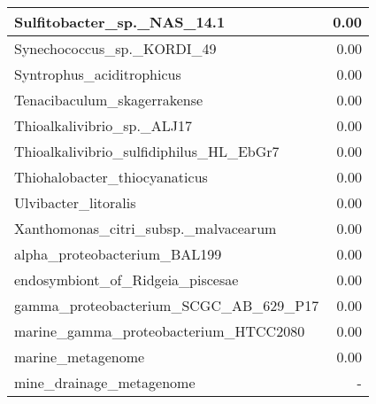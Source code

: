 \documentclass[12pt,a4paper]{article}
\begin{document}
\begin{table}[ht]
\begin{center}
\begin{tabular}{|l*{1}{|r}|}
Sulfitobacter\_sp.\_NAS\_14.1 & 0.00 \\ \hline
Synechococcus\_sp.\_KORDI\_49 & 0.00 \\ \hline
Syntrophus\_aciditrophicus & 0.00 \\ \hline
Tenacibaculum\_skagerrakense & 0.00 \\ \hline
Thioalkalivibrio\_sp.\_ALJ17 & 0.00 \\ \hline
Thioalkalivibrio\_sulfidiphilus\_HL\_EbGr7 & 0.00 \\ \hline
Thiohalobacter\_thiocyanaticus & 0.00 \\ \hline
Ulvibacter\_litoralis & 0.00 \\ \hline
Xanthomonas\_citri\_subsp.\_malvacearum & 0.00 \\ \hline
alpha\_proteobacterium\_BAL199 & 0.00 \\ \hline
endosymbiont\_of\_Ridgeia\_piscesae & 0.00 \\ \hline
gamma\_proteobacterium\_SCGC\_AB\_629\_P17 & 0.00 \\ \hline
marine\_gamma\_proteobacterium\_HTCC2080 & 0.00 \\ \hline
marine\_metagenome & 0.00 \\ \hline
mine\_drainage\_metagenome & - \\ \hline
\end{tabular}
\end{center}
\end{table}
\end{document}
